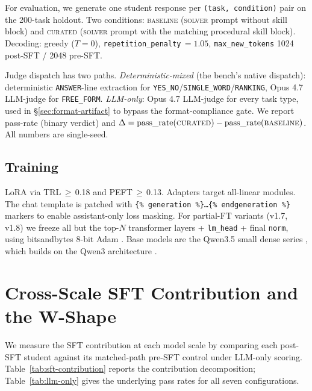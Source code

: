 \documentclass[10pt]{article}
\newcommand{\BL}{\textsc{baseline}\xspace}
\newcommand{\CU}{\textsc{curated}\xspace}
\begin{document}
For evaluation, we generate one student response per \texttt{(task, condition)} pair on the 200-task holdout. Two conditions: \BL{} (\textsc{solver} prompt without skill block) and \CU{} (\textsc{solver} prompt with the matching procedural skill block). Decoding: greedy ($T{=}0$), \texttt{repetition\_penalty}\,$=1.05$, \texttt{max\_new\_tokens} 1024 post-SFT / 2048 pre-SFT.

Judge dispatch has two paths. \textit{Deterministic-mixed} (the bench's native dispatch): deterministic \texttt{ANSWER}-line extraction for \texttt{YES\_NO}/\texttt{SINGLE\_WORD}/\texttt{RANKING}, Opus 4.7 LLM-judge for \texttt{FREE\_FORM}. \textit{LLM-only}: Opus 4.7 LLM-judge for every task type, used in \S\ref{sec:format-artifact} to bypass the format-compliance gate. We report pass-rate (binary verdict) and $\Delta = \mathrm{pass\_rate}(\CU) - \mathrm{pass\_rate}(\BL)$. All numbers are single-seed.

\subsection{Training}
LoRA \citep{hu2022lora} via TRL\,$\geq$\,0.18 \citep{trl} and PEFT\,$\geq$\,0.13. Adapters target all-linear modules. The chat template is patched with \texttt{\{\% generation \%\}\dots\{\% endgeneration \%\}} markers to enable assistant-only loss masking. For partial-FT variants (v1.7, v1.8) we freeze all but the top-$N$ transformer layers + \texttt{lm\_head} + final \texttt{norm}, using bitsandbytes 8-bit Adam \citep{dettmers2023qlora}. Base models are the Qwen3.5 small dense series \citep{qwen35release}, which builds on the Qwen3 architecture \citep{qwen3report}.

\section{Cross-Scale SFT Contribution and the W-Shape}\label{sec:cross-scale}

We measure the SFT contribution at each model scale by comparing each post-SFT student against its matched-path pre-SFT control under LLM-only scoring. Table~\ref{tab:sft-contribution} reports the contribution decomposition; Table~\ref{tab:llm-only} gives the underlying pass rates for all seven configurations.
\end{document}
